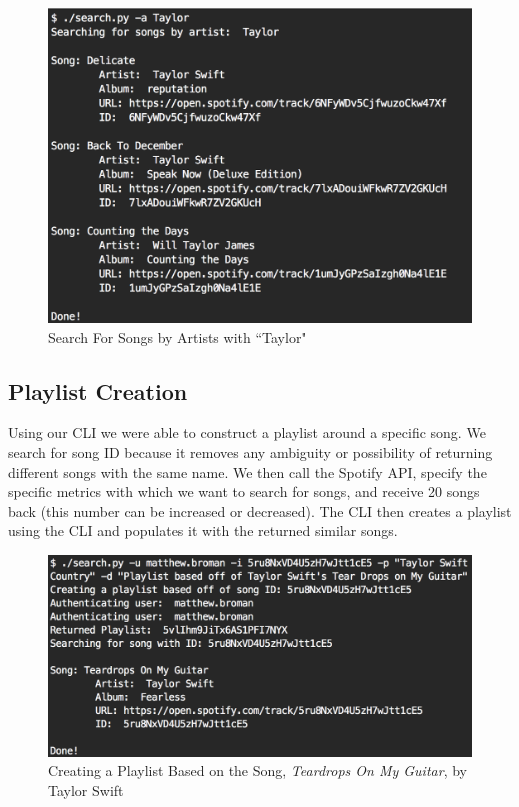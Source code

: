 \documentclass [letter,12pt] {article}
\begin{document}
        \begin{figure}[htp]
            \centering
            \includegraphics[width=\textwidth]{Artist_Taylor_Search.png}
            \caption{Search For Songs by Artists with ``Taylor"}
            \label{fig:taylorartist}
        \end{figure}
\newpage
    \subsection{Playlist Creation}
        Using our CLI we were able to construct a playlist around a specific song. We search for song ID because it removes any ambiguity or possibility of returning different songs with the same name. We then call the Spotify API, specify the specific metrics with which we want to search for songs, and receive 20 songs back (this number can be increased or decreased). The CLI then creates a playlist using the CLI and populates it with the returned similar songs.
        
        \begin{figure}[htp]
            \centering
            \includegraphics[width=\textwidth]{Playlist_Create.png}
            \caption{Creating a Playlist Based on the Song, \textit{Teardrops On My Guitar}, by Taylor Swift}
            \label{fig:playlistcreate}
        \end{figure}
        
\end{document}
